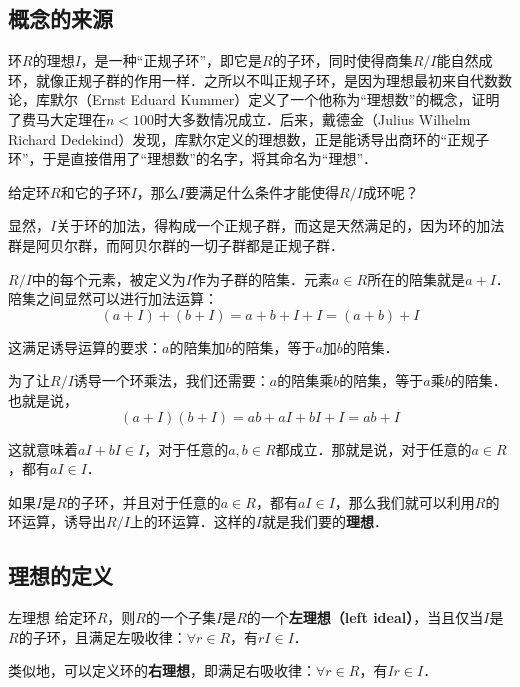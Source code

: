 
\subsection{概念的来源}

环$R$的理想$I$，是一种“正规子环”，即它是$R$的子环，同时使得商集$R/I$能自然成环，就像正规子群的作用一样．之所以不叫正规子环，是因为理想最初来自代数数论，库默尔（Ernst Eduard Kummer）定义了一个他称为“理想数”的概念，证明了费马大定理在$n<100$时大多数情况成立．后来，戴德金（Julius Wilhelm Richard Dedekind）发现，库默尔定义的理想数，正是能诱导出商环的“正规子环”，于是直接借用了“理想数”的名字，将其命名为“理想”．

给定环$R$和它的子环$I$，那么$I$要满足什么条件才能使得$R/I$成环呢？

显然，$I$关于环的加法，得构成一个正规子群，而这是天然满足的，因为环的加法群是阿贝尔群，而阿贝尔群的一切子群都是正规子群．

$R/I$中的每个元素，被定义为$I$作为子群的陪集．元素$a\in R$所在的陪集就是$a+I$．陪集之间显然可以进行加法运算：
\begin{equation}
(a+I)+(b+I)=a+b+I+I=(a+b)+I
\end{equation}

这满足诱导运算的要求：$a$的陪集加$b$的陪集，等于$a$加$b$的陪集．

为了让$R/I$诱导一个环乘法，我们还需要：$a$的陪集乘$b$的陪集，等于$a$乘$b$的陪集．也就是说，
\begin{equation}
(a+I)(b+I)=ab+aI+bI+I=ab+I
\end{equation}

这就意味着$aI+bI\in I$，对于任意的$a, b\in R$都成立．那就是说，对于任意的$a\in R$，都有$aI\in I$．

如果$I$是$R$的子环，并且对于任意的$a\in R$，都有$aI\in I$，那么我们就可以利用$R$的环运算，诱导出$R/I$上的环运算．这样的$I$就是我们要的\textbf{理想}．

\subsection{理想的定义}

\begin{definition}{左理想}
给定环$R$，则$R$的一个子集$I$是$R$的一个\textbf{左理想（left ideal）}，当且仅当$I$是$R$的子环，且满足左吸收律：$\forall r\in R$，有$rI\in I$．
\end{definition}

类似地，可以定义环的\textbf{右理想}，即满足右吸收律：$\forall r\in R$，有$Ir\in I$．

